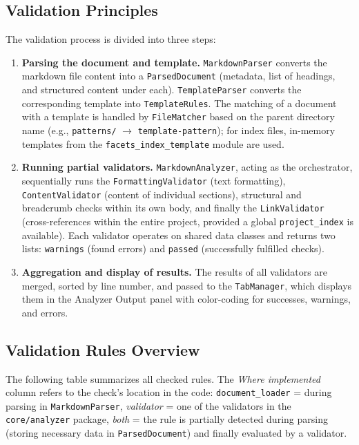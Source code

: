\documentclass[12pt, a4paper]{article}
\begin{document}
\subsection{Validation Principles}

The validation process is divided into three steps:

\begin{enumerate}
    \item \textbf{Parsing the document and template.} \texttt{MarkdownParser} converts the markdown 
    file content into a \texttt{ParsedDocument} (metadata, list of headings, and structured content under each). 
    \texttt{TemplateParser} converts the corresponding template into \texttt{TemplateRules}. The matching of a 
    document with a template is handled by \texttt{FileMatcher} based on the parent directory name (e.g., 
    \texttt{patterns/} $\rightarrow$ \texttt{template-pattern}); for index files, in-memory templates from 
    the \texttt{facets\_index\_template} module are used.
    \item \textbf{Running partial validators.} \texttt{MarkdownAnalyzer}, acting as the orchestrator, 
    sequentially runs the \texttt{FormattingValidator} (text formatting), \texttt{ContentValidator} 
    (content of individual sections), structural and breadcrumb checks within its own body, and 
    finally the \texttt{LinkValidator} (cross-references within the entire project, provided a 
    global \texttt{project\_index} is available). Each validator operates on shared data classes 
    and returns two lists: \texttt{warnings} (found errors) and \texttt{passed} (successfully fulfilled checks).
    \item \textbf{Aggregation and display of results.} The results of all validators are merged, 
    sorted by line number, and passed to the \texttt{TabManager}, which displays them in the Analyzer
    Output panel with color-coding for successes, warnings, and errors.
\end{enumerate}

\subsection{Validation Rules Overview}

The following table summarizes all checked rules. The \emph{Where implemented} column refers to the check's 
location in the code: \texttt{document\_loader} = during parsing in \texttt{MarkdownParser}, 
\emph{validator} = one of the validators in the \texttt{core/analyzer} package, \emph{both} = the rule 
is partially detected during parsing (storing necessary data in \texttt{ParsedDocument}) and finally evaluated by a validator.
\end{document}
